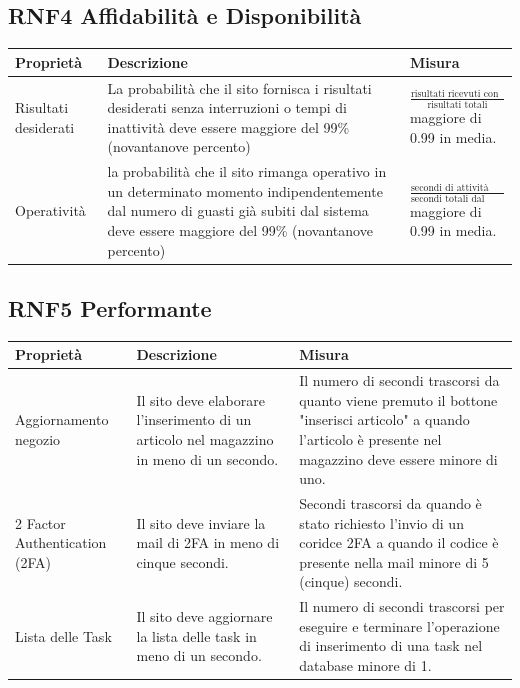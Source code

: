 \documentclass{report}
\begin{document}
\subsection*{RNF4 Affidabilità e Disponibilità}
\begin{center} %
	\centering
	\begin{tabular}{ |p{3cm}|p{4cm}|p{4cm}|  }
		\hline
		\centering Proprietà & \qquad\quad Descrizione & \qquad\qquad Misura\\ %
		\hline
		Risultati desiderati & La probabilità che il sito fornisca i risultati desiderati senza interruzioni o tempi di inattività deve essere maggiore del 99\% (novantanove percento) & $\frac{\text{risultati ricevuti con successo}}{\text{risultati totali}}$ maggiore di 0.99 in media.\\ %
		\hline
		Operatività &  la probabilità che il sito rimanga operativo in un determinato momento
		indipendentemente dal numero di guasti già subiti dal sistema deve essere maggiore del 99\% (novantanove percento) & $ \frac{\text{secondi di attività dal lancio}}{\text{secondi totali dal lancio}}$ maggiore di 0.99 in media.\\
		\hline 
	\end{tabular}
\end{center}
\subsection*{RNF5 Performante}
\begin{center} %
	\centering
	\begin{tabular}{ |p{3cm}|p{4cm}|p{4cm}|  }
		\hline
		\centering Proprietà & \qquad\quad Descrizione & \qquad\qquad Misura\\ %
		\hline
		Aggiornamento negozio & Il sito deve elaborare l'inserimento di un articolo nel magazzino in meno di un secondo. & Il numero di secondi trascorsi da quanto viene premuto il bottone "inserisci articolo" a quando l'articolo è presente nel magazzino deve essere minore di uno. \\
		\hline 
		2 Factor Authentication (2FA)& Il sito deve inviare la mail di 2FA in meno di cinque secondi. & Secondi trascorsi da quando è stato richiesto l'invio di un coridce 2FA a quando il codice è presente nella mail minore di 5 (cinque) secondi. \\
		\hline
		Lista delle Task & Il sito deve aggiornare la lista delle task in meno di un secondo. & Il numero di secondi trascorsi per eseguire e terminare l'operazione di inserimento di una task nel database minore di 1. \\ 
		\hline

	\end{tabular}
\end{center}
\end{document}
